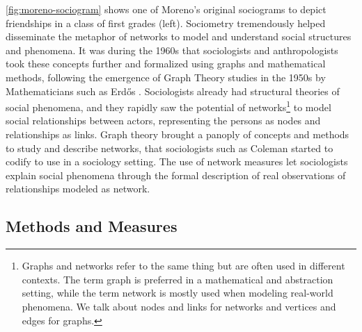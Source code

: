 \autoref{fig:moreno-sociogram} shows one of Moreno's original sociograms to depict friendships in a class of first grades (left).
Sociometry tremendously helped disseminate the metaphor of networks to model and understand social structures and phenomena.
It was during the 1960s that sociologists and anthropologists took these concepts further and formalized \sna using graphs and mathematical methods, following the emergence of Graph Theory studies in the 1950s by Mathematicians such as Erd\H{o}s \cite{erdos2011}.
Sociologists already had structural theories of social phenomena, and they rapidly saw the potential of networks\footnote{Graphs and networks refer to the same thing but are often used in different contexts. The term graph is preferred in a mathematical and abstraction setting, while the term network is mostly used when modeling real-world phenomena. We talk about nodes and links for networks and vertices and edges for graphs.} to model social relationships between actors, representing the persons as nodes and relationships as links.
Graph theory brought a panoply of concepts and methods to study and describe networks, that sociologists such as Coleman started to codify to use in a sociology setting\cite{colemanIntroductionMathematicalSociology1964}.
The use of network measures let sociologists explain social phenomena through the formal description of real observations of relationships modeled as network.


\subsection{Methods and Measures}\label{subsec:methods-and-measures}





